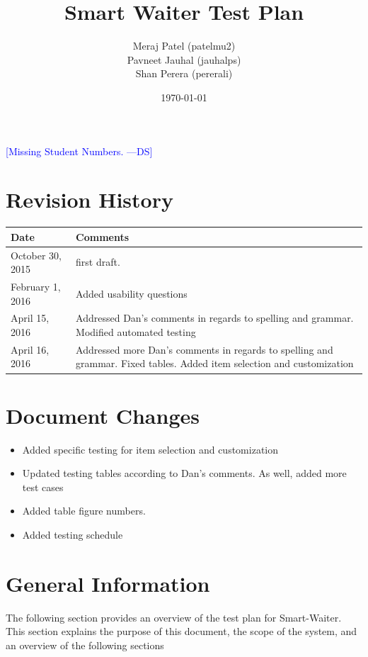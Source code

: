 \documentclass[12pt]{article}
\newcommand{\authornote}[3]{\textcolor{#1}{[#3 ---#2]}}
\newcommand{\authornote}[3]{}
\newcommand{\ds}[1]{\authornote{blue}{DS}{#1}}
\begin{document}
\title{Smart Waiter Test Plan} 
\author{Meraj Patel (patelmu2) \\ Pavneet Jauhal (jauhalps)\\ Shan Perera (pererali)}
\date{\today}
\maketitle
\ds{Missing Student Numbers.}

\pagebreak

\tableofcontents

\listoftables
\section*{Revision History}
\begin{tabular}{|p{5cm}|p{5cm}|}
\hline
\textbf{Date}  & \textbf{Comments} \\ \hline
October 30, 2015 &  first draft. \\ 
February 1, 2016 &  Added usability questions \\ 
April 15, 2016 &  Addressed Dan's comments in regards to spelling and grammar. Modified automated testing \\ 
April 16, 2016 &  Addressed more Dan's comments in regards to spelling and grammar. Fixed tables. Added item selection and customization\\ 
\hline
\end{tabular}

\pagebreak

\section{Document Changes}
\begin{itemize}
 \item Added specific testing for item selection and customization
 \item Updated testing tables according to Dan's comments. As well, added more test cases
 \item Added table figure numbers.
 \item Added testing schedule
 \end{itemize}

%
%

\section{General Information}
The following section provides an overview of the test plan 
for Smart-Waiter.
 This section explains the purpose of this document, the scope of the system, and an overview of the following sections
\end{document}
